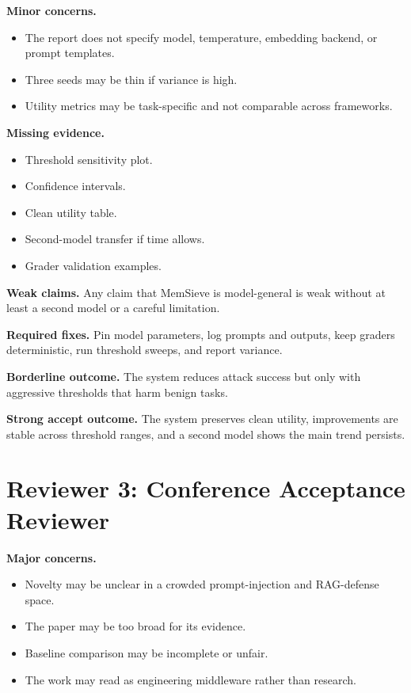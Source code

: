\documentclass[11pt,oneside]{report}
\newcommand{\project}{MemSieve}
\begin{document}
\textbf{Minor concerns.}
\begin{itemize}
  \item The report does not specify model, temperature, embedding backend, or prompt templates.
  \item Three seeds may be thin if variance is high.
  \item Utility metrics may be task-specific and not comparable across frameworks.
\end{itemize}

\textbf{Missing evidence.}
\begin{itemize}
  \item Threshold sensitivity plot.
  \item Confidence intervals.
  \item Clean utility table.
  \item Second-model transfer if time allows.
  \item Grader validation examples.
\end{itemize}

\textbf{Weak claims.} Any claim that \project{} is model-general is weak without at least a second
model or a careful limitation.

\textbf{Required fixes.} Pin model parameters, log prompts and outputs, keep graders deterministic,
run threshold sweeps, and report variance.

\textbf{Borderline outcome.} The system reduces attack success but only with aggressive thresholds
that harm benign tasks.

\textbf{Strong accept outcome.} The system preserves clean utility, improvements are stable across
threshold ranges, and a second model shows the main trend persists.

\section{Reviewer 3: Conference Acceptance Reviewer}

\textbf{Major concerns.}
\begin{itemize}
  \item Novelty may be unclear in a crowded prompt-injection and RAG-defense space.
  \item The paper may be too broad for its evidence.
  \item Baseline comparison may be incomplete or unfair.
  \item The work may read as engineering middleware rather than research.
\end{itemize}
\end{document}
